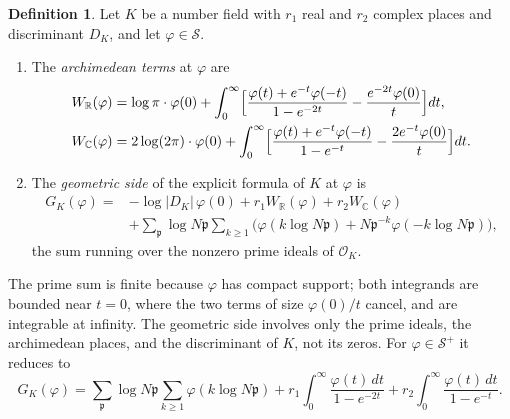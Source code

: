 \documentclass[11pt]{amsart}
\theoremstyle{plain}
\theoremstyle{definition}
\newtheorem{definition}[theorem]{Definition}
\theoremstyle{remark}
\numberwithin{equation}{section}
\newcommand{\C}{\mathbb{C}}
\newcommand{\R}{\mathbb{R}}
\newcommand{\cO}{\mathcal{O}}
\begin{document}
\begin{definition}\label{def:geom-side}
Let $K$ be a number field with $r_1$ real and $r_2$ complex places and
discriminant $D_K$, and let $\varphi\in\mathcal S$.
\begin{enumerate}[label=(\alph*)]
\item The \emph{archimedean terms} at $\varphi$ are
  \[
  \begin{aligned}
  W_\R(\varphi)&=\log\pi\cdot\varphi(0)+\int_0^\infty\Bigl[
  \frac{\varphi(t)+e^{-t}\varphi(-t)}{1-e^{-2t}}
  -\frac{e^{-2t}\varphi(0)}t\Bigr]dt,\\
  W_\C(\varphi)&=2\log(2\pi)\cdot\varphi(0)+\int_0^\infty\Bigl[
  \frac{\varphi(t)+e^{-t}\varphi(-t)}{1-e^{-t}}
  -\frac{2e^{-t}\varphi(0)}t\Bigr]dt.
  \end{aligned}
  \]
\item The \emph{geometric side} of the explicit formula of $K$ at
  $\varphi$ is
  \[
  \begin{aligned}
  G_K(\varphi)={}&-\log|D_K|\,\varphi(0)+r_1W_\R(\varphi)
  +r_2W_\C(\varphi)\\
  &+\sum_{\mathfrak p}\log N\mathfrak p\sum_{k\ge1}
  \bigl(\varphi(k\log N\mathfrak p)
  +N\mathfrak p^{-k}\varphi(-k\log N\mathfrak p)\bigr),
  \end{aligned}
  \]
  the sum running over the nonzero prime ideals of $\cO_K$.
\end{enumerate}
\end{definition}

The prime sum is finite because $\varphi$ has compact support; both
integrands are bounded near $t=0$, where the two terms of size
$\varphi(0)/t$ cancel, and are integrable at infinity. The geometric
side involves only the prime ideals, the archimedean places, and the
discriminant of $K$, not its zeros. For $\varphi\in\mathcal S^+$ it
reduces to
\begin{equation}\label{eq:geom-one-sided}
G_K(\varphi)=\sum_{\mathfrak p}\log N\mathfrak p\sum_{k\ge1}
\varphi(k\log N\mathfrak p)+r_1\int_0^\infty
\frac{\varphi(t)\,dt}{1-e^{-2t}}+r_2\int_0^\infty
\frac{\varphi(t)\,dt}{1-e^{-t}}.
\end{equation}
\end{document}

